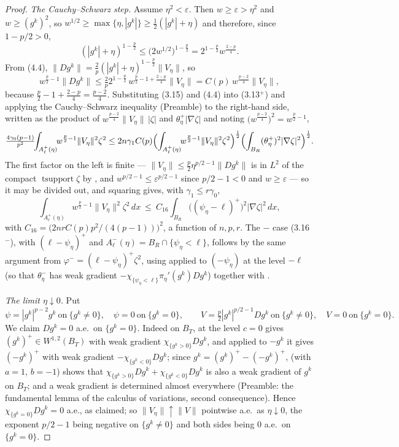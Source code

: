 \begin{proof}
\emph{The Cauchy--Schwarz step.}  Assume $\eta^2<\varepsilon$.  Then
$w\ge\varepsilon>\eta^2$ and $w\ge(g^k)^2$, so
$w^{1/2}\ge\max\{\eta,|g^k|\}\ge\tfrac12(|g^k|+\eta)$ and therefore, since
$1-p/2>0$,
\[
(|g^k|+\eta)^{1-\frac p2}\le\bigl(2w^{1/2}\bigr)^{1-\frac p2}
=2^{1-\frac p2}w^{\frac{2-p}4}.
\]
From (4.4), $\|Dg^k\|=\tfrac2p(|g^k|+\eta)^{1-\frac p2}\|V_\eta\|$, so
\[
w^{\frac p2-1}\|Dg^k\|\le\tfrac2p2^{1-\frac p2}\,
w^{\frac p2-1+\frac{2-p}4}\|V_\eta\|
=C(p)\,w^{\frac{p-2}4}\|V_\eta\| ,
\tag{3.15}
\]
because $\tfrac p2-1+\tfrac{2-p}4=\tfrac{p-2}4$.  Substituting (3.15) and
(4.4) into (3.13$^+$) and applying the Cauchy--Schwarz inequality (Preamble) to
the right-hand side, written as the product of
$w^{\frac{p-2}4}\|V_\eta\|\,|\zeta|$ and $\theta^+_\eta|\nabla\zeta|$ and noting
$\bigl(w^{\frac{p-2}4}\bigr)^2=w^{\frac p2-1}$,
\[
\tfrac{4\gamma_0(p-1)}{p^2}\!\!\int_{A^+_\ell(\eta)}\!\!w^{\frac p2-1}\|V_\eta\|^2\zeta^2
\le2n\gamma_1C(p)\Bigl(\int_{A^+_\ell(\eta)}\!\!w^{\frac p2-1}\|V_\eta\|^2\zeta^2\Bigr)^{\frac12}
\Bigl(\int_{B_R}(\theta^+_\eta)^2|\nabla\zeta|^2\Bigr)^{\frac12}.
\]
The first factor on the left is finite --- $\|V_\eta\|\le\tfrac p2\eta^{p/2-1}\|Dg^k\|$
is in $L^2$ of the compact $\operatorname{tsupport}\zeta$ by
, and $w^{p/2-1}\le\varepsilon^{p/2-1}$ since $p/2-1<0$ and
$w\ge\varepsilon$ --- so it may be divided out, and squaring gives, with
$\gamma_1\le r\gamma_0$,
\[
\int_{A^+_\ell(\eta)}w^{\frac p2-1}\|V_\eta\|^2\zeta^2\,dx
\ \le\ C_{16}\int_{B_R}\bigl((\psi_\eta-\ell)^+\bigr)^2|\nabla\zeta|^2\,dx ,
\tag{3.16$^+$}
\]
with $C_{16}=\bigl(2nrC(p)p^2/(4(p-1))\bigr)^2$, a function of $n,p,r$.  The
$-$ case (3.16$^-$), with $(\ell-\psi_\eta)^+$ and
$A^-_\ell(\eta)=B_R\cap\{\psi_\eta<\ell\}$, follows by the same argument from
$\varphi^-=(\ell-\psi_\eta)^+\zeta^2$, using
 applied to $(-\psi_\eta)$ at the level
$-\ell$ (so that $\theta^-_\eta$ has weak gradient
$-\chi_{\{\psi_\eta<\ell\}}\pi_\eta'(g^k)Dg^k$) together with
.

\emph{The limit $\eta\downarrow0$.}  Put
\[
\psi=|g^k|^{p-2}g^k\ \text{on}\ \{g^k\ne0\},\quad\psi=0\ \text{on}\ \{g^k=0\},
\qquad
V=\tfrac p2|g^k|^{p/2-1}Dg^k\ \text{on}\ \{g^k\ne0\},\quad V=0\ \text{on}\ \{g^k=0\} .
\]
We claim $Dg^k=0$ a.e.\ on $\{g^k=0\}$.  Indeed on $B_T$,
 at the level $c=0$ gives
$(g^k)^+\in W^{1,2}(B_T)$ with weak gradient $\chi_{\{g^k>0\}}Dg^k$, and
applied to $-g^k$ it gives $(-g^k)^+$ with weak gradient
$-\chi_{\{g^k<0\}}Dg^k$; since $g^k=(g^k)^+-(-g^k)^+$,
 (with $a=1$, $b=-1$) shows that
$\chi_{\{g^k>0\}}Dg^k+\chi_{\{g^k<0\}}Dg^k$ is also a weak gradient of $g^k$ on
$B_T$; and a weak gradient is determined almost everywhere (Preamble: the
fundamental lemma of the calculus of variations, second consequence).  Hence
$\chi_{\{g^k=0\}}Dg^k=0$ a.e., as claimed; so
$\|V_\eta\|\uparrow\|V\|$ pointwise a.e.\ as $\eta\downarrow0$, the exponent
$p/2-1$ being negative on $\{g^k\ne0\}$ and both sides being $0$ a.e.\ on
$\{g^k=0\}$.


\end{proof}
